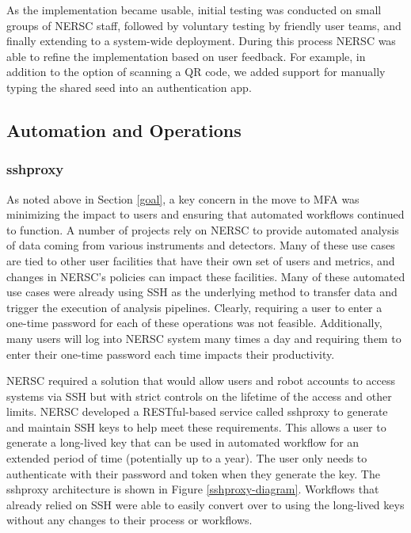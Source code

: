 \documentclass[sigconf,review]{acmart}
\begin{document}
As the implementation became usable, initial testing was conducted on small
groups of NERSC staff, followed by voluntary testing by friendly user teams, and
finally extending to a system-wide deployment. During this process NERSC was
able to refine the implementation based on user feedback. For example, in
addition to the option of scanning a QR code, we added support for manually
typing the shared seed into an authentication app.

\subsection{Automation and Operations}
\label{auto}

\subsubsection{sshproxy}
\label{proxy}

As noted above in Section \ref{goal}, a key concern in the move to MFA was
minimizing the impact to users and ensuring that automated workflows continued
to function. A number of projects rely on NERSC to provide automated analysis of
data coming from various instruments and detectors.  Many of these use cases are
tied to other user facilities that have their own set of users and metrics, and
changes in NERSC's policies can impact these facilities.  Many of these
automated use cases were already using SSH as the underlying method to transfer
data and trigger the execution of analysis pipelines.  Clearly, requiring a user
to enter a one-time password for each of these operations was not feasible.
Additionally, many users will log into NERSC system many times a day and
requiring them to enter their one-time password each time impacts their
productivity. 

NERSC required a solution that would allow users and robot
accounts to access systems via SSH but with strict controls on the lifetime of
the access and other limits.  NERSC developed a RESTful-based service called
sshproxy to generate and maintain SSH keys to help meet these requirements. 
This allows a user to generate a long-lived key that can be used in automated
workflow for an extended period of time (potentially up to a year). The user
only needs to authenticate with their password and token when they generate the key.
The sshproxy architecture is shown in Figure \ref{sshproxy-diagram}.
Workflows that already relied on SSH were able to easily convert over to using
the long-lived keys without any changes to their process or workflows.
\end{document}
